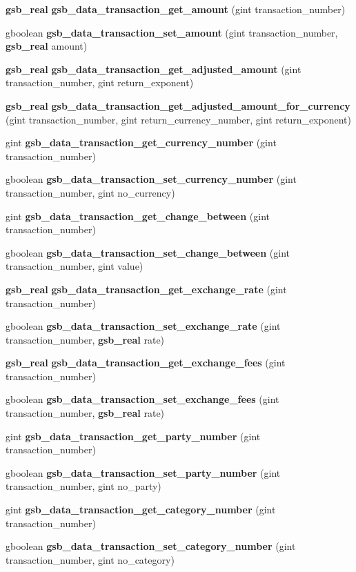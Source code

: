 \begin{DoxyCompactItemize}
\item 
{\bf gsb\_\-real} {\bf gsb\_\-data\_\-transaction\_\-get\_\-amount} (gint transaction\_\-number)
\item 
gboolean {\bf gsb\_\-data\_\-transaction\_\-set\_\-amount} (gint transaction\_\-number, {\bf gsb\_\-real} amount)
\item 
{\bf gsb\_\-real} {\bf gsb\_\-data\_\-transaction\_\-get\_\-adjusted\_\-amount} (gint transaction\_\-number, gint return\_\-exponent)
\item 
{\bf gsb\_\-real} {\bf gsb\_\-data\_\-transaction\_\-get\_\-adjusted\_\-amount\_\-for\_\-currency} (gint transaction\_\-number, gint return\_\-currency\_\-number, gint return\_\-exponent)
\item 
gint {\bf gsb\_\-data\_\-transaction\_\-get\_\-currency\_\-number} (gint transaction\_\-number)
\item 
gboolean {\bf gsb\_\-data\_\-transaction\_\-set\_\-currency\_\-number} (gint transaction\_\-number, gint no\_\-currency)
\item 
gint {\bf gsb\_\-data\_\-transaction\_\-get\_\-change\_\-between} (gint transaction\_\-number)
\item 
gboolean {\bf gsb\_\-data\_\-transaction\_\-set\_\-change\_\-between} (gint transaction\_\-number, gint value)
\item 
{\bf gsb\_\-real} {\bf gsb\_\-data\_\-transaction\_\-get\_\-exchange\_\-rate} (gint transaction\_\-number)
\item 
gboolean {\bf gsb\_\-data\_\-transaction\_\-set\_\-exchange\_\-rate} (gint transaction\_\-number, {\bf gsb\_\-real} rate)
\item 
{\bf gsb\_\-real} {\bf gsb\_\-data\_\-transaction\_\-get\_\-exchange\_\-fees} (gint transaction\_\-number)
\item 
gboolean {\bf gsb\_\-data\_\-transaction\_\-set\_\-exchange\_\-fees} (gint transaction\_\-number, {\bf gsb\_\-real} rate)
\item 
gint {\bf gsb\_\-data\_\-transaction\_\-get\_\-party\_\-number} (gint transaction\_\-number)
\item 
gboolean {\bf gsb\_\-data\_\-transaction\_\-set\_\-party\_\-number} (gint transaction\_\-number, gint no\_\-party)
\item 
gint {\bf gsb\_\-data\_\-transaction\_\-get\_\-category\_\-number} (gint transaction\_\-number)
\item 
gboolean {\bf gsb\_\-data\_\-transaction\_\-set\_\-category\_\-number} (gint transaction\_\-number, gint no\_\-category)
\item 

\end{DoxyCompactItemize}
